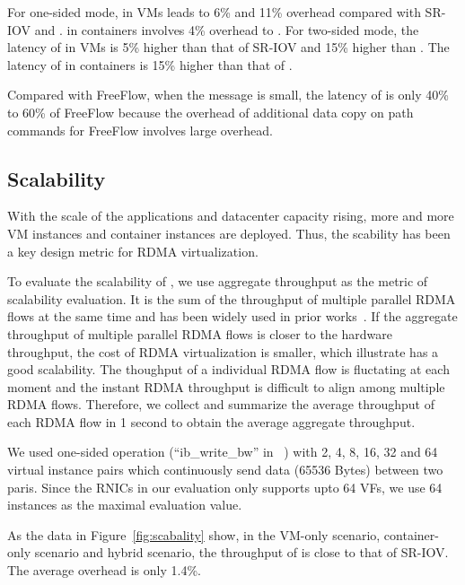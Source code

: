 For one-sided mode, \sys in VMs leads to 6\% and 11\% overhead compared with SR-IOV and \native. \sys in containers involves 4\% overhead to \native. For two-sided mode, the latency of \sys in VMs is 5\% higher than that of SR-IOV and 15\% higher than \native. The latency of \sys in containers is 15\% higher than that of \native.

Compared with FreeFlow, when the message is small, the latency of \sys is only 40\% to 60\% of FreeFlow because the overhead of additional data copy on path commands for FreeFlow involves large overhead. 





\subsection{Scalability}

With the scale of the applications and datacenter capacity rising, more and more VM instances and container instances are deployed. Thus, the scability has been a key design metric for RDMA virtualization.

To evaluate the scalability of \sys, we use aggregate throughput as the metric of scalability evaluation. It is the sum of the throughput of multiple parallel RDMA flows at the same time and has been widely used in prior works~\cite{kim2019freeflow, pfefferle2015hybrid, he2020masq}. If the aggregate throughput of multiple parallel RDMA flows is closer to the hardware throughput, the cost of RDMA virtualization is smaller, which illustrate \sys has a good scalability. The thoughput of a individual RDMA flow is fluctating at each moment and the instant RDMA throughput is difficult to align among multiple RDMA flows. Therefore, we collect and summarize the average throughput of each RDMA flow in 1 second to obtain the average aggregate throughput.

We used one-sided operation (``ib\_write\_bw'' in ~\cite{perftest}) with 2, 4, 8, 16, 32 and 64 virtual instance pairs which continuously send data (65536 Bytes) between two paris. Since the RNICs in our evaluation only supports upto 64 VFs, we use 64 instances as the maximal evaluation value.

As the data in Figure~\ref{fig:scabality} show, in the VM-only scenario, container-only scenario and hybrid scenario, the throughput of \sys is close to that of SR-IOV. The average overhead is only 1.4\%.



